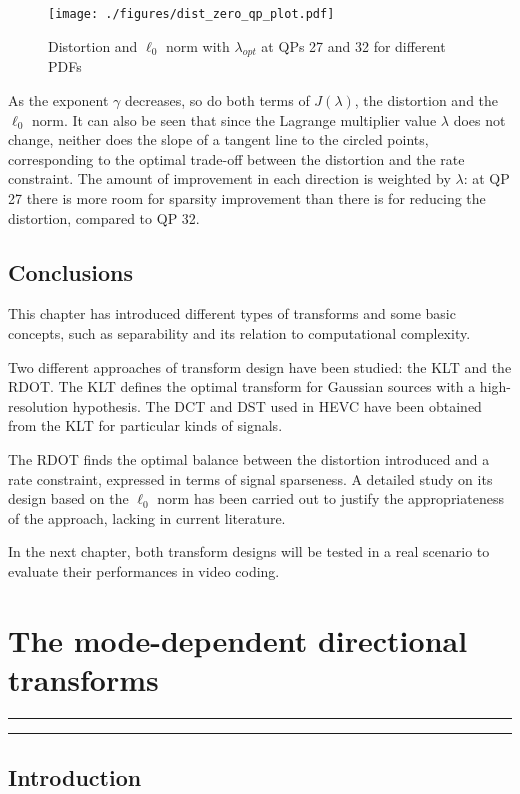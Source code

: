 \documentclass[11pt,a4paper,openright,twoside]{book}
\providecommand{\chaptertoc}{
	\startcontents[chapters]
	\hrule
	\vspace{1em}
	\printcontents[chapters]{}{1}{{\sf\large\bfseries Contents}}
	\hrule
}
\numberwithin{equation}{section} %
\numberwithin{figure}{section} %
\numberwithin{table}{section} %
\begin{document}
\begin{figure}[tp]
	\centering
	\texttt{[image: ./figures/dist\_zero\_qp\_plot.pdf]}
	\caption{Distortion and $\ell_0$ norm with $\lambda_{opt}$ at
	\acsp{QP} 27 and 32 for different \acsp{PDF}}
	\label{fig:lambda_zero_norm_dist}
\end{figure}

As the exponent $\gamma$ decreases, so do both terms of $J(\lambda)$,
the distortion and the $\ell_0$ norm.
It can also be seen that since the Lagrange multiplier value $\lambda$
does not change, neither does the slope of a tangent line to the circled
points, corresponding to the optimal trade-off between the distortion
and the rate constraint.
The amount of improvement in each direction is weighted by $\lambda$: at
\ac{QP} 27 there is more room for sparsity improvement than there is for
reducing the distortion, compared to \ac{QP} 32.

\section{Conclusions}
\label{sec:conclusions_transforms}

This chapter has introduced different types of transforms and some
basic concepts, such as separability and its relation to computational
complexity.

Two different approaches of transform design have been studied:
the \ac{KLT} and the \ac{RDOT}.
The \ac{KLT} defines the optimal transform for Gaussian sources with a
high-resolution hypothesis.
The \ac{DCT} and \ac{DST} used in \ac{HEVC} have been obtained from the
\ac{KLT} for particular kinds of signals.

The \ac{RDOT} finds the optimal balance between the distortion
introduced and a rate constraint, expressed in terms of signal sparseness.
A detailed study on its design based on the $\ell_0$ norm has been carried out
to justify the appropriateness of the approach, lacking in current literature.

In the next chapter, both transform designs will be tested in a real
scenario to evaluate their performances in video coding.


\chapter{The mode-dependent directional transforms}
\label{cha:mddt}
\chaptertoc

\section{Introduction}
\label{sec:mddt_introduction}
\end{document}
